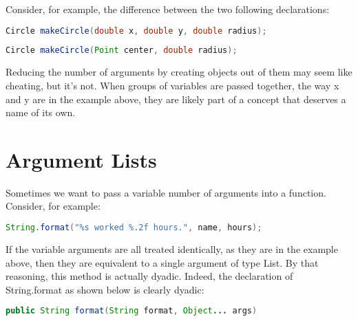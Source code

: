 Consider, for example, the difference between the two following declarations:

\begin{tcolorbox}[breakable, colback=green!10!white, colframe=green!85!black, center title, sidebyside]

\begin{lstlisting}[language = java, basicstyle=\small]
Circle makeCircle(double x, double y, double radius);
\end{lstlisting}

\tcblower

\begin{lstlisting}[language = java, basicstyle=\small]
Circle makeCircle(Point center, double radius);
\end{lstlisting}

\end{tcolorbox}

Reducing the number of arguments by creating objects out of them may seem like cheating, but it's not. When groups of variables are passed together, the way x and y are in the example above, they are likely part of a concept that deserves a name of its own.

\section{Argument Lists}

Sometimes we want to pass a variable number of arguments into a function. Consider, for example:

\begin{tcolorbox}[breakable, colback=green!10!white, colframe=green!85!black]
\begin{lstlisting}[language = java, basicstyle=\small]
String.format("%s worked %.2f hours.", name, hours);
\end{lstlisting}
\end{tcolorbox}

If the variable arguments are all treated identically, as they are in the example above, then they are equivalent to a single argument of type List. By that reasoning, this method is actually dyadic. Indeed, the declaration of String.format as shown below is clearly dyadic:

\begin{tcolorbox}[breakable, colback=green!10!white, colframe=green!85!black]
\begin{lstlisting}[language = java, basicstyle=\small]
public String format(String format, Object... args)
\end{lstlisting}
\end{tcolorbox}

